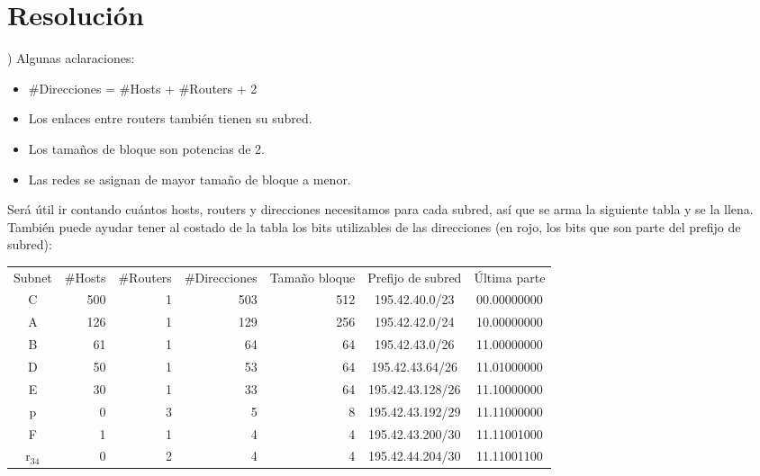 \section*{Resolución}

) Algunas aclaraciones:

\begin{itemize}
\item \#Direcciones = \#Hosts + \#Routers + 2
\item Los enlaces entre routers también tienen su subred.
\item Los tamaños de bloque son potencias de 2.
\item Las redes se asignan de mayor tamaño de bloque a menor.
\end{itemize}

Será útil ir contando cuántos hosts, routers y direcciones necesitamos para cada subred, así que se arma la siguiente tabla y se la llena. También puede ayudar tener al costado de la tabla los bits utilizables de las direcciones (en rojo, los bits que son parte del prefijo de subred):

\begin{table}[H]
    \centering
    \begin{tabular}{|c|r|r|r|r|c|c}
    \cline{1-6}
    \multicolumn{1}{|c|}{Subnet} & \multicolumn{1}{c|}{\#Hosts} & \multicolumn{1}{c|}{\#Routers} & \multicolumn{1}{c|}{\#Direcciones} & \multicolumn{1}{c|}{Tamaño bloque} & \multicolumn{1}{c|}{Prefijo de subred} & Última parte\\ \cline{1-6}
    C & 500 & 1 & 503 & 512 & 195.42.40.0/23 & {\color{red}0}0.00000000\\ \cline{1-6}
    A & 126 & 1 & 129 & 256 & 195.42.42.0/24 & {\color{red}10}.00000000\\ \cline{1-6}
    B & 61 & 1 & 64 & 64 & 195.42.43.0/26 & {\color{red}11.00}000000\\ \cline{1-6}
    D & 50 & 1 & 53 & 64 & 195.42.43.64/26 & {\color{red}11.01}000000\\ \cline{1-6}
    E & 30 & 1 & 33 & 64 & 195.42.43.128/26 & {\color{red}11.10}000000\\ \cline{1-6}
    p & 0 & 3 & 5 & 8 & 195.42.43.192/29 & {\color{red}11.11000}000\\ \cline{1-6}
    F & 1 & 1 & 4 & 4 & 195.42.43.200/30 & {\color{red}11.110010}00\\ \cline{1-6}
    $\text{r}_{34}$ & 0 & 2 & 4 & 4 & 195.42.44.204/30 & {\color{red}11.110011}00\\\cline{1-6}
    \end{tabular}
\end{table}

